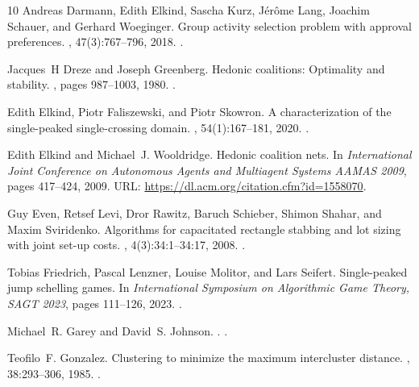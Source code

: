 \documentclass[a4paper]{article}
\begin{document}
\begin{thebibliography}{10}
Andreas Darmann, Edith Elkind, Sascha Kurz, J{\'{e}}r{\^{o}}me Lang, Joachim Schauer, and Gerhard Woeginger.
\newblock Group activity selection problem with approval preferences.
, 47(3):767--796, 2018.
\newblock \href {https://doi.org/10.1007/S00182-017-0596-4} {}.

Jacques~H Dreze and Joseph Greenberg.
\newblock Hedonic coalitions: Optimality and stability.
, pages 987--1003, 1980.
\newblock \href {https://doi.org/10.2307/1912943} {}.

Edith Elkind, Piotr Faliszewski, and Piotr Skowron.
\newblock A characterization of the single-peaked single-crossing domain.
, 54(1):167--181, 2020.
\newblock \href {https://doi.org/10.1007/S00355-019-01216-3} {}.

Edith Elkind and Michael~J. Wooldridge.
\newblock Hedonic coalition nets.
\newblock In {\em International Joint Conference on Autonomous Agents and Multiagent Systems {AAMAS} 2009}, pages 417--424, 2009.
\newblock URL: \url{https://dl.acm.org/citation.cfm?id=1558070}.

Guy Even, Retsef Levi, Dror Rawitz, Baruch Schieber, Shimon Shahar, and Maxim Sviridenko.
\newblock Algorithms for capacitated rectangle stabbing and lot sizing with joint set-up costs.
, 4(3):34:1--34:17, 2008.
\newblock \href {https://doi.org/10.1145/1367064.1367074} {}.

Tobias Friedrich, Pascal Lenzner, Louise Molitor, and Lars Seifert.
\newblock Single-peaked jump schelling games.
\newblock In {\em International Symposium on Algorithmic Game Theory, {SAGT} 2023}, pages 111--126, 2023.
\newblock \href {https://doi.org/10.1007/978-3-031-43254-5\_7} {}.

Michael~R. Garey and David~S. Johnson.
.
.

Teofilo~F. Gonzalez.
\newblock Clustering to minimize the maximum intercluster distance.
, 38:293--306, 1985.
\newblock \href {https://doi.org/10.1016/0304-3975(85)90224-5} {}.


\end{thebibliography}
\end{document}
